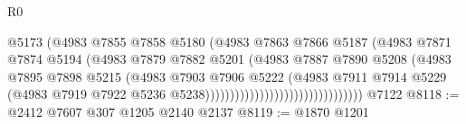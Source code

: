 \begin{lexlean}{R0}
\begin{coremodule}
                                                  @5173
                                                  (@4983
                                                    @7855
                                                    @7858
                                                    @5180
                                                    (@4983
                                                      @7863
                                                      @7866
                                                      @5187
                                                      (@4983
                                                        @7871
                                                        @7874
                                                        @5194
                                                        (@4983
                                                          @7879
                                                          @7882
                                                          @5201
                                                          (@4983
                                                            @7887
                                                            @7890
                                                            @5208
                                                            (@4983
                                                              @7895
                                                              @7898
                                                              @5215
                                                              (@4983
                                                                @7903
                                                                @7906
                                                                @5222
                                                                (@4983
                                                                  @7911
                                                                  @7914
                                                                  @5229
                                                                  (@4983
                                                                    @7919
                                                                    @7922
                                                                    @5236
                                                                    @5238))))))))))))))))))))))))))))))))
    @7122
@8118 := @2412 @7607 @307 @1205 @2140 @2137
@8119 := @1870 @1201

\end{coremodule}
\end{lexlean}

